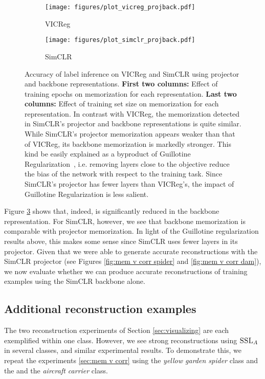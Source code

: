 \begin{figure}[h]
     \centering
     \begin{subfigure}[b]{\textwidth}
         \centering
         \texttt{[image: figures/plot\_vicreg\_projback.pdf]}
         \caption{VICReg}
         \label{fig:vicreg v. epoch}
     \end{subfigure}
     \begin{subfigure}[b]{\textwidth}
         \centering
         \texttt{[image: figures/plot\_simclr\_projback.pdf]}
         \caption{SimCLR}
         \label{fig:vicreg lp v. epoch}
     \end{subfigure}
     \hfill
\caption{
Accuracy of label inference on VICReg and SimCLR using projector and backbone representations. \textbf{First two columns:} Effect of training epochs on memorization for each representation. \textbf{Last two columns:} Effect of training set size on memorization for each representation. In contrast with VICReg, the \dejavu memorization detected in SimCLR's projector and backbone representations is quite similar. While SimCLR's projector memorization appears weaker than that of VICReg, its backbone memorization is markedly stronger. This kind be easily explained as a byproduct of Guillotine Regularization~\citep{Guillotine}, i.e. removing layers close to the objective reduce the bias of the network with respect to the training task. Since SimCLR's projector has fewer layers than VICReg's, the impact of Guillotine Regularization is less salient.
}
\label{fig:proj v backbone}
\end{figure}

Figure \ref{fig:proj v backbone} shows that, indeed, \dejavu is significantly reduced in the backbone representation. For SimCLR, however, we see that backbone memorization is comparable with projector memorization. In light of the Guillotine regularization results above, this makes some sense since SimCLR uses fewer layers in its projector. Given that we were able to generate accurate reconstructions with the SimCLR projector (see Figures \ref{fig:mem v corr spider} and \ref{fig:mem v corr dam}), we now evaluate whether we can produce accurate reconstructions of training examples using the SimCLR backbone alone. 

\clearpage

\subsection{Additional reconstruction examples}
\label{sec:appx visualization}
The two reconstruction experiments of Section \ref{sec:visualizing} are each exemplified within one class. However, we see strong reconstructions using $\textsc{SSL}_A$ in several classes, and similar experimental results. To demonstrate this, we repeat the experiments \ref{sec:mem v corr} using the \emph{yellow garden spider} class and the and the \emph{aircraft carrier} class. 

